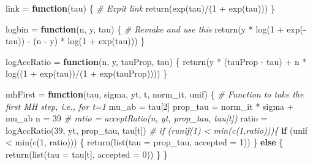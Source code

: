 \documentclass[
]{article}
\newenvironment{Shaded}{\begin{snugshade}}{\end{snugshade}}
\newcommand{\AttributeTok}[1]{\textcolor[rgb]{0.77,0.63,0.00}{#1}}
\newcommand{\CommentTok}[1]{\textcolor[rgb]{0.56,0.35,0.01}{\textit{#1}}}
\newcommand{\ControlFlowTok}[1]{\textcolor[rgb]{0.13,0.29,0.53}{\textbf{#1}}}
\newcommand{\DecValTok}[1]{\textcolor[rgb]{0.00,0.00,0.81}{#1}}
\newcommand{\FunctionTok}[1]{\textcolor[rgb]{0.00,0.00,0.00}{#1}}
\newcommand{\NormalTok}[1]{#1}
\newcommand{\OtherTok}[1]{\textcolor[rgb]{0.56,0.35,0.01}{#1}}
\newcommand{\SpecialCharTok}[1]{\textcolor[rgb]{0.00,0.00,0.00}{#1}}
\begin{document}
\begin{Shaded}
\begin{Highlighting}[]
\NormalTok{link }\OtherTok{=} \ControlFlowTok{function}\NormalTok{(tau) \{}
    \CommentTok{\# Expit link}
    \FunctionTok{return}\NormalTok{(}\FunctionTok{exp}\NormalTok{(tau)}\SpecialCharTok{/}\NormalTok{(}\DecValTok{1} \SpecialCharTok{+} \FunctionTok{exp}\NormalTok{(tau)))}
\NormalTok{\}}

\NormalTok{logbin }\OtherTok{=} \ControlFlowTok{function}\NormalTok{(n, y, tau) \{}
    \CommentTok{\# Remake and use this}
    \FunctionTok{return}\NormalTok{(y }\SpecialCharTok{*} \FunctionTok{log}\NormalTok{(}\DecValTok{1} \SpecialCharTok{+} \FunctionTok{exp}\NormalTok{(}\SpecialCharTok{{-}}\NormalTok{tau)) }\SpecialCharTok{{-}}\NormalTok{ (n }\SpecialCharTok{{-}}\NormalTok{ y) }\SpecialCharTok{*} \FunctionTok{log}\NormalTok{(}\DecValTok{1} \SpecialCharTok{+} \FunctionTok{exp}\NormalTok{(tau)))}
\NormalTok{\}}

\NormalTok{logAccRatio }\OtherTok{=} \ControlFlowTok{function}\NormalTok{(n, y, tauProp, tau) \{}
    \FunctionTok{return}\NormalTok{(y }\SpecialCharTok{*}\NormalTok{ (tauProp }\SpecialCharTok{{-}}\NormalTok{ tau) }\SpecialCharTok{+}\NormalTok{ n }\SpecialCharTok{*} \FunctionTok{log}\NormalTok{((}\DecValTok{1} \SpecialCharTok{+} \FunctionTok{exp}\NormalTok{(tau))}\SpecialCharTok{/}\NormalTok{(}\DecValTok{1} \SpecialCharTok{+} \FunctionTok{exp}\NormalTok{(tauProp))))}
\NormalTok{\}}

\NormalTok{mhFirst }\OtherTok{=} \ControlFlowTok{function}\NormalTok{(tau, sigma, yt, t, norm\_it, unif) \{}
    \CommentTok{\# Function to take the first MH step, i.e., for t=1}
\NormalTok{    mu\_ab }\OtherTok{=}\NormalTok{ tau[}\DecValTok{2}\NormalTok{]}
\NormalTok{    prop\_tau }\OtherTok{=}\NormalTok{ norm\_it }\SpecialCharTok{*}\NormalTok{ sigma }\SpecialCharTok{+}\NormalTok{ mu\_ab}
\NormalTok{    n }\OtherTok{=} \DecValTok{39}
    \CommentTok{\# ratio = acceptRatio(n, yt, prop\_tau, tau[t])}
\NormalTok{    ratio }\OtherTok{=} \FunctionTok{logAccRatio}\NormalTok{(}\DecValTok{39}\NormalTok{, yt, prop\_tau, tau[t])}
    \CommentTok{\# if (runif(1) \textless{} min(c(1,ratio)))\{}
    \ControlFlowTok{if}\NormalTok{ (unif }\SpecialCharTok{\textless{}} \FunctionTok{min}\NormalTok{(}\FunctionTok{c}\NormalTok{(}\DecValTok{1}\NormalTok{, ratio))) \{}
        \FunctionTok{return}\NormalTok{(}\FunctionTok{list}\NormalTok{(}\AttributeTok{tau =}\NormalTok{ prop\_tau, }\AttributeTok{accepted =} \DecValTok{1}\NormalTok{))}
\NormalTok{    \} }\ControlFlowTok{else}\NormalTok{ \{}
        \FunctionTok{return}\NormalTok{(}\FunctionTok{list}\NormalTok{(}\AttributeTok{tau =}\NormalTok{ tau[t], }\AttributeTok{accepted =} \DecValTok{0}\NormalTok{))}
\NormalTok{    \}}
\NormalTok{\}}


\end{Highlighting}
\end{Shaded}
\end{document}
